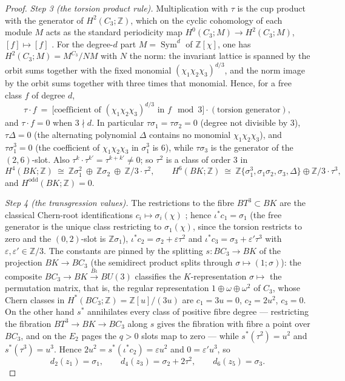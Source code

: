 \documentclass[11pt,a4paper]{article}
\begin{document}
\begin{proof}
\emph{Step 3 (the torsion product rule).} Multiplication with $\tau$ is the
cup product with the generator of $H^2(C_3;\mathbb Z)$, which on the cyclic
cohomology of each module $M$ acts as the standard periodicity map
$H^0(C_3;M)\to H^2(C_3;M)$, $[f]\mapsto[f]$ \cite{Brown1982}. For the
degree-$d$ part $M=\operatorname{Sym}^d$ of $\mathbb Z[\chi]$, one has
$H^2(C_3;M)=M^{C_3}/NM$ with $N$ the norm: the invariant lattice is spanned
by the orbit sums together with the fixed monomial
$(\chi_1\chi_2\chi_3)^{d/3}$, and the norm image by the orbit sums together
with three times that monomial. Hence, for a free class $f$ of degree $d$,
\[
\tau\cdot f\ =\ \bigl[\text{coefficient of }(\chi_1\chi_2\chi_3)^{d/3}
\text{ in }f\ \bmod 3\bigr]\cdot(\text{torsion generator}),
\]
and $\tau\cdot f=0$ when $3\nmid d$. In particular $\tau\sigma_1=
\tau\sigma_2=0$ (degree not divisible by $3$), $\tau\Delta=0$ (the
alternating polynomial $\Delta$ contains no monomial
$\chi_1\chi_2\chi_3$), and $\tau\sigma_1^3=0$ (the coefficient of
$\chi_1\chi_2\chi_3$ in $\sigma_1^3$ is $6$), while $\tau\sigma_3$ is the
generator of the $(2,6)$-slot. Also $\tau^k\cdot\tau^{k'}=\tau^{k+k'}\ne0$;
so $\tau^2$ is a class of order $3$ in
\[
H^4(BK;\mathbb Z)\ \cong\ \mathbb Z\sigma_1^2\ \oplus\ \mathbb Z\sigma_2\
\oplus\ \mathbb Z/3\cdot\tau^2,
\qquad
H^6(BK;\mathbb Z)\ \cong\ \mathbb Z\{\sigma_1^3,\sigma_1\sigma_2,\sigma_3,
\Delta\}\oplus\mathbb Z/3\cdot\tau^3,
\]
and $H^{\mathrm{odd}}(BK;\mathbb Z)=0$.

\emph{Step 4 (the transgression values).} The restrictions to the fibre
$BT^3\subset BK$ are the classical Chern-root identifications
$c_i\mapsto\sigma_i(\chi)$ \cite{MilnorStasheff1974}; hence
$\iota^*c_1=\sigma_1$ (the free generator is the unique class restricting
to $\sigma_1(\chi)$, since the torsion restricts to zero and the $(0,2)$-slot
is $\mathbb Z\sigma_1$), $\iota^*c_2=\sigma_2+\varepsilon\tau^2$
and $\iota^*c_3=\sigma_3+\varepsilon'\tau^3$ with
$\varepsilon,\varepsilon'\in\mathbb Z/3$. The constants are pinned by the
splitting $s\colon BC_3\to BK$ of the projection $BK\to BC_3$ (the
semidirect product splits through $\sigma\mapsto(1;\sigma)$): the composite
$BC_3\to BK\overset{B\iota}{\to}BU(3)$ classifies the $K$-representation
$\sigma\mapsto$ the permutation matrix, that is, the regular representation
$1\oplus\omega\oplus\omega^2$ of $C_3$, whose Chern classes in
$H^*(BC_3;\mathbb Z)=\mathbb Z[u]/(3u)$ are $c_1=3u=0$, $c_2=2u^2$,
$c_3=0$. On the other hand $s^*$ annihilates every class of positive fibre
degree --- restricting the fibration $BT^3\to BK\to BC_3$ along $s$ gives
the fibration with fibre a point over $BC_3$, and on the $E_2$ pages the
$q>0$ slots map to zero --- while $s^*(\tau^2)=u^2$ and
$s^*(\tau^3)=u^3$. Hence $2u^2=s^*(\iota^*c_2)=\varepsilon u^2$ and
$0=\varepsilon'u^3$, so
\[
d_2(z_1)=\sigma_1,\qquad d_4(z_3)=\sigma_2+2\tau^2,\qquad
d_6(z_5)=\sigma_3 .
\]


\end{proof}
\end{document}
